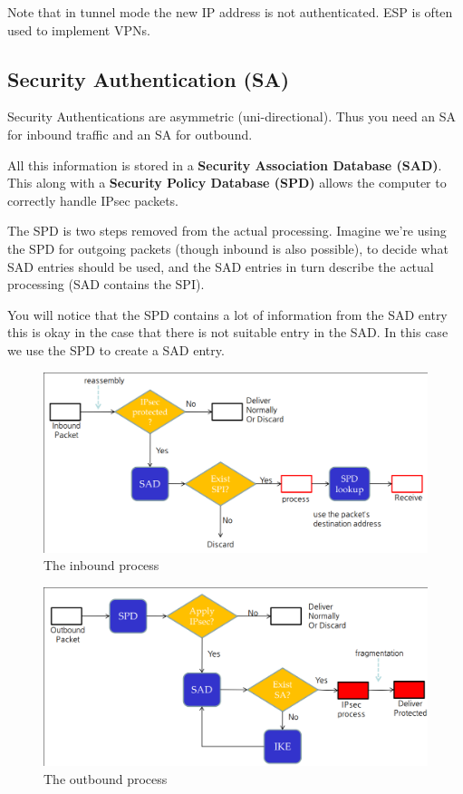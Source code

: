 \documentclass{report}
\begin{document}
Note that in tunnel mode the new IP address is not authenticated.
ESP is often used to implement VPNs.

\subsection{Security Authentication (SA)}
Security Authentications are asymmetric (uni-directional).
Thus you need an SA for inbound traffic and an SA for outbound.

All this information is stored in a \textbf{Security Association Database (SAD)}.
This along with a \textbf{Security Policy Database (SPD)} allows the computer
to correctly handle IPsec packets.

The SPD is two steps removed from the actual processing.
Imagine we're using the SPD for outgoing packets
(though inbound is also possible), to decide what SAD entries should be used,
and the SAD entries in turn describe the actual processing (SAD contains
the SPI).

You will notice that the SPD contains a lot of information from the SAD entry
this is okay in the case that there is not suitable entry in the SAD.
In this case we use the SPD to create a SAD entry.

\begin{figure}[h]
    \centering
    \includegraphics[width=\textwidth]{images/inboundprocess.png}
    \caption{The inbound process}
\end{figure}
\begin{figure}[h]
    \centering
    \includegraphics[width=\textwidth]{images/outboundprocess.png}
    \caption{The outbound process}
\end{figure}
\end{document}
